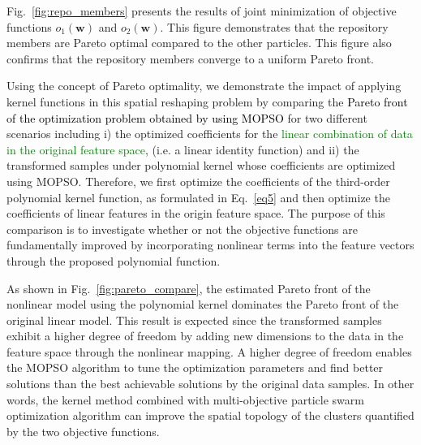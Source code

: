 Fig.~\ref{fig:repo_members} presents the results of joint minimization of objective functions $o_1(\mathbf{w})$ and $o_2(\mathbf{w})$. This figure demonstrates that the repository members are Pareto optimal compared to the other particles. This figure also confirms that the repository members converge to a uniform Pareto front. 

Using the concept of Pareto optimality, we demonstrate the impact of applying kernel functions in this spatial reshaping problem by comparing the \textcolor{black}{Pareto front of the optimization problem obtained by using MOPSO} for two different scenarios including i) the optimized coefficients for the \textcolor{green}{linear combination of data in the original feature space}, (i.e. a linear identity function) and ii) the transformed samples under polynomial kernel whose coefficients are optimized using MOPSO. Therefore, we first optimize the coefficients of the third-order polynomial kernel function, as formulated in Eq.~\ref{eq5} and then optimize the coefficients of linear features in the origin feature space. The purpose of this comparison is to investigate whether or not the objective functions are fundamentally improved by incorporating nonlinear terms into the feature vectors through the proposed polynomial function.  %


As shown in Fig.~\ref{fig:pareto_compare}, the estimated Pareto front of the nonlinear model using the polynomial kernel dominates the Pareto front of the original linear model. This result is expected since the transformed samples exhibit a higher degree of freedom by adding new dimensions to the data in the feature space through the nonlinear mapping. 
A higher degree of freedom enables the MOPSO algorithm to tune the optimization parameters and find better solutions than the best achievable solutions by the original data samples. In other words, the kernel method combined with multi-objective particle swarm optimization algorithm can improve the spatial topology of the clusters quantified by the two objective functions.


